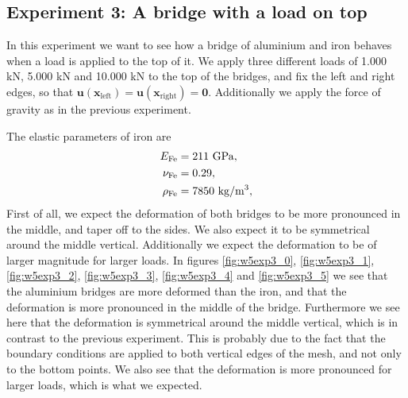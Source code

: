 \documentclass[acmtog]{acmart}
\begin{document}
\subsection{Experiment 3: A bridge with a load on top}
In this experiment we want to see how a bridge of aluminium and iron behaves when a load is applied to the top of it. We apply three different loads of 1.000 kN, 5.000 kN and 10.000 kN to the top of the bridges, and fix the left and right edges, so that $\boldsymbol u(\boldsymbol x_\mathrm{left} ) = \boldsymbol u(\boldsymbol x_\mathrm{right} ) = \boldsymbol 0$. Additionally we apply the force of gravity as in the previous experiment.

The elastic parameters of iron are
%
\begin{align}
  E_\mathrm{Fe}   & = 211 \ \mathrm{GPa},     \notag \\
  \nu_\mathrm{Fe} & = 0.29,                    \notag \\
  \rho_\mathrm{Fe} & = 7850 \ \mathrm{kg/m^3}, \notag
\end{align}
%
First of all, we expect the deformation of both bridges to be more pronounced in the middle, and taper off to the sides. We also expect it to be symmetrical around the middle vertical. Additionally we expect the deformation to be of larger magnitude for larger loads. In figures \ref{fig:w5exp3_0}, \ref{fig:w5exp3_1}, \ref{fig:w5exp3_2}, \ref{fig:w5exp3_3}, \ref{fig:w5exp3_4} and \ref{fig:w5exp3_5} we see that the aluminium bridges are more deformed than the iron, and that the deformation is more pronounced in the middle of the bridge. Furthermore we see here that the deformation is symmetrical around the middle vertical, which is in contrast to the previous experiment. This is probably due to the fact that the boundary conditions are applied to both vertical edges of the mesh, and not only to the bottom points. We also see that the deformation is more pronounced for larger loads, which is what we expected.
\end{document}
